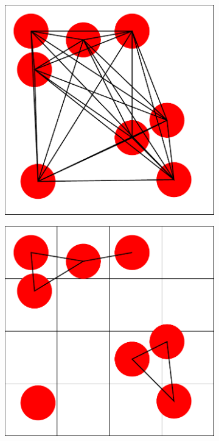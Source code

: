 \documentclass[12pt, oneside]{report}
\begin{document}
\begin{figure}[H]
  \centering

  \begin{subfigure}[b]{0.4\linewidth}
    \includegraphics[width=\linewidth,height=\linewidth]{Images/CieslaAlgorithm/adjmatrix0.pdf}
    \caption{}
		\label{adjmatrix_label0}
  \end{subfigure}
  \begin{subfigure}[b]{0.4\linewidth}
    \includegraphics[width=\linewidth,height=\linewidth]{Images/CieslaAlgorithm/adjmatrix1.pdf}
    \caption{}
		\label{adjmatrix_label1}
  \end{subfigure}


\end{figure}
\end{document}
